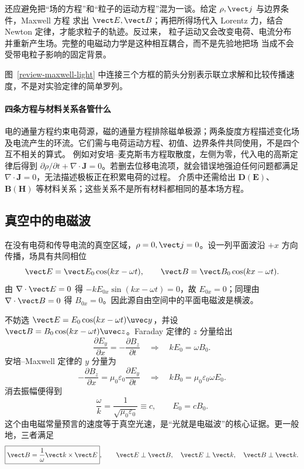 还应避免把“场的方程”和“粒子的运动方程”混为一谈。给定 $\rho,\vect j$ 与边界条件，Maxwell 方程
求出 $\vect E,\vect B$；再把所得场代入 Lorentz 力，结合 Newton 定律，才能求粒子的轨迹。反过来，
粒子运动又会改变电荷、电流分布并重新产生场。完整的电磁动力学是这种相互耦合，而不是先验地把场
当成不会受带电粒子影响的固定背景。

图~\ref{review-maxwell-light} 中连接三个方框的箭头分别表示联立求解和比较传播速度，不是对实验定律的简单罗列。

\maxwellLightPanel


\paragraph{四条方程与材料关系各管什么}
电的通量方程约束电荷源，磁的通量方程排除磁单极源；两条旋度方程描述变化场及电流产生的环流。它们需与电荷运动方程、初值、边界条件共同使用，不是四个互不相关的算式。
例如对安培--麦克斯韦方程取散度，左侧为零，代入电的高斯定律后得到
$\partial\rho/\partial t+\nabla\cdot\boldsymbol J=0$。若删去位移电流项，就会错误地强迫任何问题都满足 $\nabla\cdot\boldsymbol J=0$，无法描述极板正在积累电荷的过程。
介质中还需给出 $\boldsymbol D(\boldsymbol E)$、$\boldsymbol B(\boldsymbol H)$ 等材料关系；这些关系不是所有材料都相同的基本场方程。

\subsection{真空中的电磁波}

在没有电荷和传导电流的真空区域，$\rho=0,\vect j=0$。设一列平面波沿 $+x$ 方向传播，场具有共同相位
\begin{equation}
  \vect E=\vect E_0\cos(kx-\omega t),
  \qquad
  \vect B=\vect B_0\cos(kx-\omega t).
\end{equation}
由 $\nabla\cdot\vect E=0$ 得 $-kE_{0x}\sin(kx-\omega t)=0$，故 $E_{0x}=0$；同理由
$\nabla\cdot\vect B=0$ 得 $B_{0x}=0$。因此源自由空间中的平面电磁波是横波。

不妨选 $\vect E=E_0\cos(kx-\omega t)\uvec y$，并设
$\vect B=B_0\cos(kx-\omega t)\uvec z$。Faraday 定律的 $z$ 分量给出
\begin{equation}
  \frac{\partial E_y}{\partial x}=-\frac{\partial B_z}{\partial t}
  \quad\Longrightarrow\quad
  kE_0=\omega B_0.
\end{equation}
安培--Maxwell 定律的 $y$ 分量为
\begin{equation}
  -\frac{\partial B_z}{\partial x}
  =\mu_0\varepsilon_0\frac{\partial E_y}{\partial t}
  \quad\Longrightarrow\quad
  kB_0=\mu_0\varepsilon_0\omega E_0.
\end{equation}
消去振幅便得到
\begin{equation}
  \boxed{\frac{\omega}{k}=\frac{1}{\sqrt{\mu_0\varepsilon_0}}\equiv c},
  \qquad
  \boxed{E_0=cB_0}.
\end{equation}
这个由电磁常量预言的速度等于真空光速，是“光就是电磁波”的核心证据。更一般地，三者满足
\begin{equation}
  \boxed{\vect B=\frac{1}{\omega}\vect k\times\vect E},
  \qquad
  \vect E\perp\vect B,\quad \vect E\perp\vect k,
  \quad \vect B\perp\vect k.
\end{equation}

